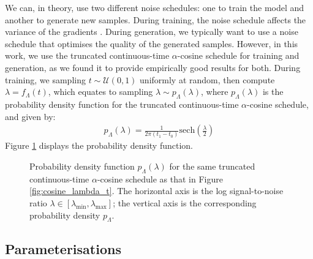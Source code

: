 \documentclass[ oneside,%
                    author={George Herbert},
                    degree={MSci},
                     title={Video Diffusion Models for Climate Simulations},
                  subtitle={}]{dissertation}
\begin{document}
We can, in theory, use two different noise schedules: one to train the model and another to generate new samples. During training, the noise schedule affects the variance of the gradients \cite{Understanding_Diffusion_Objective_Kingma}. During generation, we typically want to use a noise schedule that optimises the quality of the generated samples. However, in this work, we use the truncated continuous-time $\alpha$-cosine schedule for training and generation, as we found it to provide empirically good results for both. During training, we sampling $t\sim\mathcal{U}(0,1)$ uniformly at random, then compute $\lambda=f_\Lambda(t)$, which equates to sampling $\lambda\sim p_\Lambda(\lambda)$, where $p_\Lambda(\lambda)$ is the probability density function for the truncated continuous-time $\alpha$-cosine schedule, and given by:
\begin{align}
      p_\Lambda(\lambda)=\frac{1}{2\pi(t_1-t_0)}\mathrm{sech}\left(\frac{\lambda}{2}\right)
\end{align}
Figure \ref{fig:p_lambda} displays the probability density function.
\begin{figure}[htbp]
      \centering
      \caption{Probability density function $p_\Lambda(\lambda)$ for the same truncated continuous-time $\alpha$-cosine schedule as that in Figure \ref{fig:cosine_lambda_t}. The horizontal axis is the log signal-to-noise ratio $\lambda\in[\lambda_{\min}, \lambda_{\max}]$; the vertical axis is the corresponding probability density $p_\Lambda$.}
      \label{fig:p_lambda}
\end{figure}

\subsection{Parameterisations}
\label{sec:background_diffusion_parameterisations}
\end{document}
